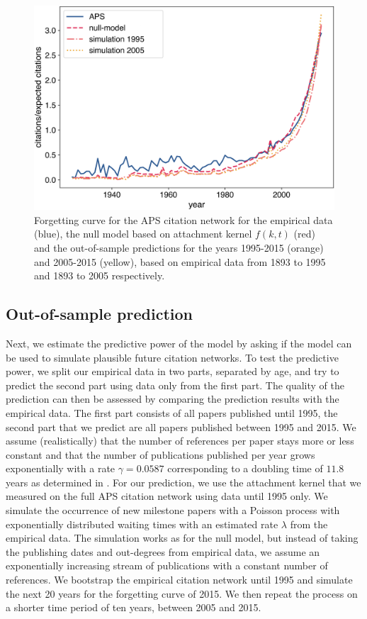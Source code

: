 \documentclass[fleqn,10pt]{wlscirep}
\begin{document}
\begin{figure}[h!]
	\centering
	  \includegraphics[width=0.7\columnwidth]{2.png}
		\caption{Forgetting curve for the APS citation network for the empirical data (blue), the null model based on attachment kernel $f(k, t)$ (red) and the out-of-sample predictions for the years 1995-2015 (orange) and 2005-2015 (yellow), based on empirical data from 1893 to 1995 and 1893 to 2005 respectively.}
	\label{fig:nullcomparison}
\end{figure}

\subsection*{Out-of-sample prediction} Next, we estimate the predictive power of the model by asking if the model can be used to simulate plausible future citation networks. To test the predictive power, we split our empirical data in two parts, separated by age, and try to predict the second part using data only from the first part. The quality of the prediction can then be assessed by comparing the prediction results with the empirical data. The first part consists of all papers published until 1995, the second part that we predict are all papers published between 1995 and 2015. We assume (realistically) that the number of references per paper stays more or less constant and that the number of publications published per year grows exponentially with a rate $\gamma = 0.0587$ corresponding to a doubling time of $11.8$ years as determined in \cite{Martin2013}. For our prediction, we use the attachment kernel that we measured on the full APS citation network using data until 1995 only. We simulate the occurrence of new milestone papers with a Poisson process with exponentially distributed waiting times with an estimated rate $\lambda$ from the empirical data. The simulation works as for the null model, but instead of taking the publishing dates and out-degrees from empirical data, we assume an exponentially increasing stream of publications with a constant number of references. We bootstrap the empirical citation network until 1995 and simulate the next 20 years for the forgetting curve of 2015. We then repeat the process on a shorter time period of ten years, between 2005 and 2015.
\end{document}
